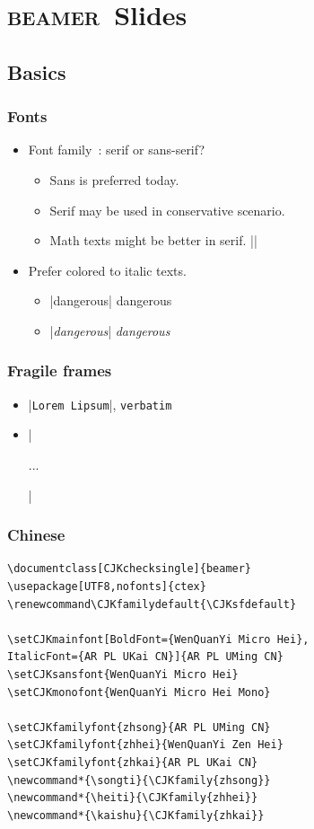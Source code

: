 \documentclass[CJKchecksingle]{beamer}
\newcommand*{\songti}{\CJKfamily{zhsong}} %
\newcommand*{\heiti}{\CJKfamily{zhhei}}   %
\newcommand*{\kaishu}{\CJKfamily{zhkai}}  %
\newcommand{\env}[1]{\lstinline|#1|}
\newcommand{\beamer}{\textsc{beamer}}
\begin{document}
\section{\beamer\ Slides}
\subsection{Basics}
\begin{frame}[fragile]\frametitle{Fonts}

\begin{itemize}
\item
  Font family~\cite{beamer}: serif or sans-serif?
\begin{itemize}
  \item
    Sans is preferred today.
  \item
    Serif may be used in conservative scenario.
  \item
    Math texts might be better in serif.
    ||
\end{itemize}
\pause
\item
  Prefer colored to italic texts.
\begin{itemize}
  \item |\alert{dangerous}| \alert{dangerous}
  \item |\emph{dangerous}| \emph{dangerous}
\end{itemize}
\end{itemize}

\end{frame}

\begin{frame}[fragile]\frametitle{Fragile frames}
  \begin{itemize}
    \item |\verb+Lorem Lipsum+|, \env{verbatim}
    \item |\begin{frame}[fragile] ... \end{frame}|
  \end{itemize}
\end{frame}

\begin{frame}[fragile]\frametitle{Chinese}

\begin{lstlisting}
\documentclass[CJKchecksingle]{beamer}
\usepackage[UTF8,nofonts]{ctex}
\renewcommand\CJKfamilydefault{\CJKsfdefault}

\setCJKmainfont[BoldFont={WenQuanYi Micro Hei},
ItalicFont={AR PL UKai CN}]{AR PL UMing CN}
\setCJKsansfont{WenQuanYi Micro Hei}
\setCJKmonofont{WenQuanYi Micro Hei Mono}

\setCJKfamilyfont{zhsong}{AR PL UMing CN}
\setCJKfamilyfont{zhhei}{WenQuanYi Zen Hei}
\setCJKfamilyfont{zhkai}{AR PL UKai CN}
\newcommand*{\songti}{\CJKfamily{zhsong}}
\newcommand*{\heiti}{\CJKfamily{zhhei}}
\newcommand*{\kaishu}{\CJKfamily{zhkai}}
\end{lstlisting}

\end{frame}
\end{document}
